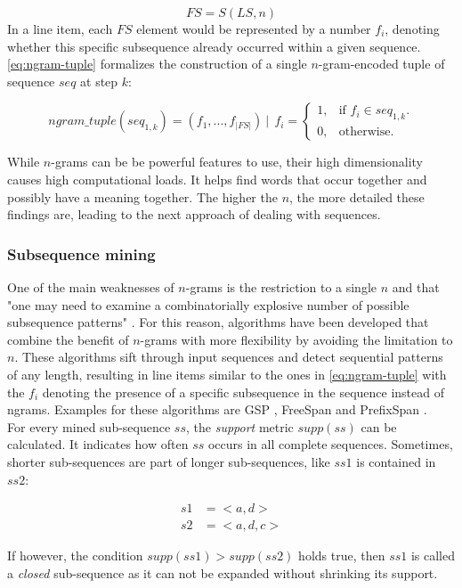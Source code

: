 $$
FS = S(LS, n)
$$
In a line item, each $FS$ element would be represented by a number $f_i$, denoting whether this specific subsequence already occurred within a given sequence. \autoref{eq:ngram-tuple} formalizes the construction of a single $n$-gram-encoded tuple of sequence $seq$ at step $k$:

\begin{equation}\label{eq:ngram-tuple}
    ngram\_tuple(seq_{1,k}) = (f_1, ..., f_{|FS|})\ |\ \ f_i = 
    \begin{cases}
    1, & \text{if $f_i \in seq_{1,k}$}.\\
    0, & \text{otherwise}.
    \end{cases}
\end{equation}

While $n$-grams can be be powerful features to use, their high dimensionality causes high computational loads. It helps find words that occur together and possibly have a meaning together. The higher the $n$, the more detailed these findings are, leading to the next approach of dealing with sequences.

\subsubsection*{Subsequence mining}
One of the main weaknesses of $n$-grams is the restriction to a single $n$ and that "one may need to examine a combinatorially explosive
number of possible subsequence patterns" \cite{pei2001prefixspan}. For this reason, algorithms have been developed that combine the benefit of $n$-grams with more flexibility by avoiding the limitation to $n$. These algorithms sift through input sequences and detect sequential patterns of any length, resulting in line items similar to the ones in \autoref{eq:ngram-tuple} with the $f_i$ denoting the presence of a specific subsequence in the sequence instead of ngrams. Examples for these algorithms are GSP \cite{srikant1996gsp}, FreeSpan \cite{han2000freespan} and PrefixSpan \cite{pei2001prefixspan}.\\

For every mined sub-sequence $ss$, the \textit{support} metric $supp(ss)$ can be calculated. It indicates how often $ss$ occurs in all complete sequences. Sometimes, shorter sub-sequences are part of longer sub-sequences, like $ss1$ is contained in $ss2$:

\begin{equation*}
\begin{split}
s1 &= <a,d>\\
s2 &= <a,d,c>
\end{split}
\end{equation*}

If however, the condition $supp(ss1)>supp(ss2)$ holds true, then $ss1$ is called a \textit{closed} sub-sequence as it can not be expanded without shrinking its support.